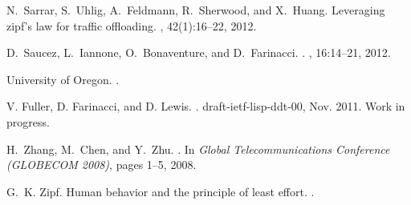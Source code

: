 \documentclass[twocolumn, 10pt]{article}
\theoremstyle{plain}
\begin{document}
\begin{thebibliography}{10}
N.~Sarrar, S.~Uhlig, A.~Feldmann, R.~Sherwood, and X.~Huang.
\newblock Leveraging zipf's law for traffic offloading.
, 42(1):16--22, 2012.

D.~Saucez, L.~Iannone, O.~Bonaventure, and D.~Farinacci.
.
, 16:14--21, 2012.

{University of Oregon}.
.

{V. Fuller, D. Farinacci, and D. Lewis}.
.
\newblock draft-ietf-lisp-ddt-00, Nov. 2011.
\newblock Work in progress.

H.~Zhang, M.~Chen, and Y.~Zhu.
.
\newblock In {\em Global Telecommunications Conference (GLOBECOM 2008)}, pages
  1--5, 2008.

G.~K. Zipf.
\newblock Human behavior and the principle of least effort.
.

\end{thebibliography}
\normalsize
\end{document}
